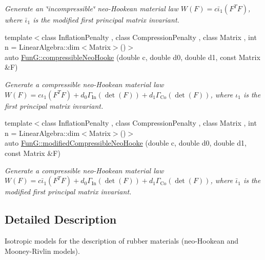 \begin{DoxyCompactItemize}
\begin{DoxyCompactList}\small\item\em Generate an \char`\"{}incompressible\char`\"{} neo-\/\-Hookean material law $ W(F)=c\bar\iota_1(F^T F) $, where $\bar\iota_1$ is the modified first principal matrix invariant. \end{DoxyCompactList}\item 
{\footnotesize template$<$class Inflation\-Penalty , class Compression\-Penalty , class Matrix , int n = Linear\-Algebra\-::dim$<$\-Matrix$>$()$>$ }\\auto \hyperlink{group__Rubber_gac5c39cd9de55f4f0220a806cf28a7b30}{Fun\-G\-::compressible\-Neo\-Hooke} (double c, double d0, double d1, const Matrix \&F)
\begin{DoxyCompactList}\small\item\em Generate a compressible neo-\/\-Hookean material law $ W(F)=c\iota_1(F^T F)+d_0\Gamma_\mathrm{In}(\det(F))+d_1\Gamma_\mathrm{Co}(\det(F)) $, where $\iota_1$ is the first principal matrix invariant. \end{DoxyCompactList}\item 
{\footnotesize template$<$class Inflation\-Penalty , class Compression\-Penalty , class Matrix , int n = Linear\-Algebra\-::dim$<$\-Matrix$>$()$>$ }\\auto \hyperlink{group__Rubber_gac10942df03f037afdf0a81d330361a6b}{Fun\-G\-::modified\-Compressible\-Neo\-Hooke} (double c, double d0, double d1, const Matrix \&F)
\begin{DoxyCompactList}\small\item\em Generate a compressible neo-\/\-Hookean material law $ W(F)=c\bar\iota_1(F^T F)+d_0\Gamma_\mathrm{In}(\det(F))+d_1\Gamma_\mathrm{Co}(\det(F)) $, where $\bar\iota_1$ is the modified first principal matrix invariant. \end{DoxyCompactList}\end{DoxyCompactItemize}


\subsection{Detailed Description}
Isotropic models for the description of rubber materials (neo-\/\-Hookean and Mooney-\/\-Rivlin models). 

